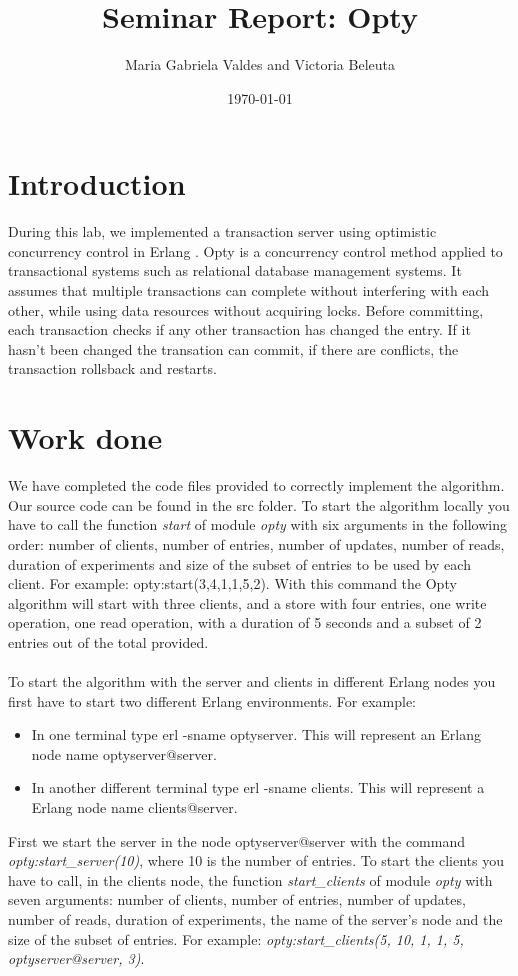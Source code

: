 \documentclass[a4paper, 11pt]{article}
\title{Seminar Report: Opty}
\author{Maria Gabriela Valdes and Victoria Beleuta}
\date{\today{}}
\begin{document}
\maketitle

\section{Introduction}

During this lab, we implemented a transaction server using optimistic concurrency control in Erlang . Opty is a concurrency control method applied to transactional systems such as relational database management systems. It assumes that multiple transactions can complete without interfering with each other, while using data resources without acquiring locks. Before committing, each transaction checks if any other transaction has changed the entry. If it hasn't been changed the transation can commit, if there are conflicts, the transaction rollsback and restarts.
 
\section{Work done}

We have completed the code files provided to correctly implement the algorithm. Our source code can be found in the src folder. To start the algorithm locally you have to call the function \textit{start} of module \textit{opty} with six arguments in the following order: number of clients, number of entries, number of updates, number of reads, duration of experiments and size of the subset of entries to be used by each client. For example: opty:start(3,4,1,1,5,2). With this command the Opty algorithm will start with three clients, and a store with four entries, one write operation, one read operation, with a duration of 5 seconds and a subset of 2 entries out of the total provided. \\\\
To start the algorithm with the server and clients in different Erlang nodes you first have to start two different Erlang environments. For example:
\begin{itemize}
\item In one terminal type erl -sname optyserver. This will represent an Erlang node name optyserver@server.\\
\item In another different terminal type erl -sname clients. This will represent a Erlang node name clients@server.\\
\end{itemize}
%
First we start the server in the node optyserver@server with the command \textit{opty:start\_server(10)}, where 10 is the number of entries. To start the clients you have to call, in the clients node, the function \textit{start\_clients} of module \textit{opty} with seven arguments: number of clients, number of entries, number of updates, number of reads, duration of experiments, the name of the server’s node and the size of the subset of entries. For example: 
\textit{opty:start\_clients(5, 10, 1, 1, 5, optyserver@server, 3)}.\\
\end{document}
